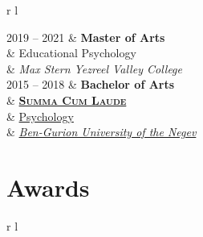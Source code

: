 \documentclass[
	11pt,a4paper %
]{article}
\newcommand{\qualificationentry}[5]{
	\textsc{#1} & \textbf{#2}\\ %
	\expandafter\ifstrequal\expandafter{#3}{}{}{& {\small\textsc{#3}}\\} %
	\expandafter\ifstrequal\expandafter{#4}{}{}{& #4\\} %
	\expandafter\ifstrequal\expandafter{#5}{}{}{& \textit{#5}\\[5pt]} %
}
\newcommand{\tableentry}[3]{
	\textsc{#1} & #2\expandafter\ifstrequal\expandafter{#3}{}{\\}{\\[5pt]} %
}
\begin{document}
\begin{paracol}{2}
\begin{supertabular}{r l} %


	\qualificationentry
		{2019 -- 2021} %
		{Master of Arts} %
		{} %
		{Educational Psychology} %
		{Max Stern Yezreel Valley College} %

	\qualificationentry
		{2015 -- 2018} %
		{Bachelor of Arts} %
		{\href{https://loona-il.000webhostapp.com/resume-references/BA-and-honorary.pdf}{\textbf{Summa Cum Laude}}} %
		{\href{https://loona-il.000webhostapp.com/resume-references/BA-and-honorary.pdf}{Psychology}} %
		{\href{https://loona-il.000webhostapp.com/resume-references/BA-and-honorary.pdf}{Ben-Gurion University of the Negev}} %


\end{supertabular}


\section{Awards}




\begin{supertabular}{r l} %


\end{supertabular}
\end{paracol}
\end{document}
